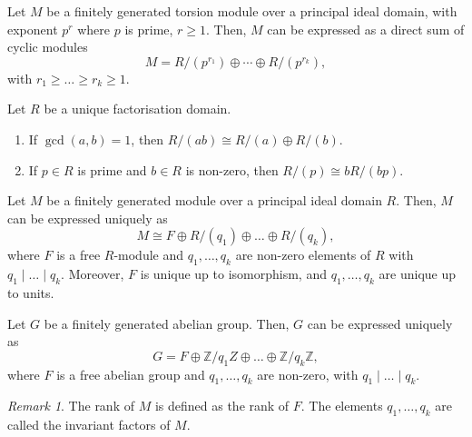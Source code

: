 \documentclass[11pt]{article}
\newcommand{\Z}{\mathbb{Z}}
\theoremstyle{definition}
\theoremstyle{remark}
\newtheorem*{remark}{Remark}
\numberwithin{equation}{section}
\begin{document}
    \begin{lemma}
        Let $M$ be a finitely generated torsion module over a principal ideal domain,
        with exponent $p^r$ where $p$ is prime, $r\geq 1$. Then, $M$ can be expressed
        as a direct sum of cyclic modules \[
            M = R/(p^{r_1}) \oplus \cdots \oplus R/(p^{r_k}),
        \] with $r_1 \geq \dots \geq r_k \geq 1$.
    \end{lemma}


    \begin{lemma}
        Let $R$ be a unique factorisation domain. \begin{enumerate}
            \itemsep0em
            \item If $\gcd(a, b) = 1$, then $R/(ab) \cong R/(a) \oplus R/(b)$.
            \item If $p \in R$ is prime and $b \in R$ is non-zero, then $R/(p) \cong
            b R/(bp)$.
        \end{enumerate}
    \end{lemma}


    \begin{theorem}
        Let $M$ be a finitely generated module over a principal ideal domain $R$.
        Then, $M$ can be expressed uniquely as \[
            M \cong F\oplus R/(q_1) \oplus \dots \oplus R/(q_k),
        \] where $F$ is a free $R$-module and $q_1, \dots, q_k$ are non-zero elements
        of $R$ with $q_1\mid \dots \mid q_k$. Moreover, $F$ is unique up to
        isomorphism, and $q_1, \dots, q_k$ are unique up to units.
    \end{theorem}

    \begin{corollary}
        Let $G$ be a finitely generated abelian group. Then, $G$ can be expressed
        uniquely as \[
            G = F \oplus \Z/q_1Z \oplus \dots \oplus \Z/q_k\Z,
        \] where $F$ is a free abelian group and $q_1, \dots, q_k$ are non-zero, with
        $q_1\mid \dots \mid q_k$.

        \begin{remark}
            The rank of $M$ is defined as the rank of $F$. The elements $q_1, \dots,
            q_k$ are called the invariant factors of $M$.
        \end{remark}
    \end{corollary}
\end{document}
